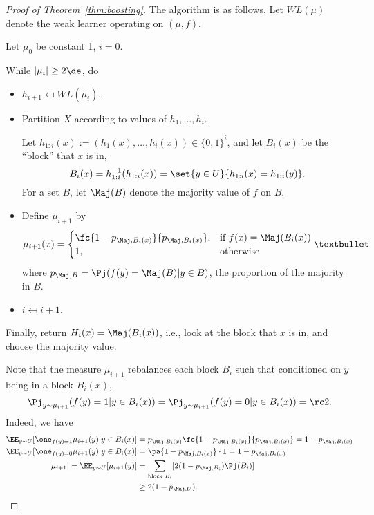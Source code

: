 \begin{proof}[Proof of Theorem~\ref{thm:boosting}]

The algorithm is as follows. Let $WL(\mu)$ denote the weak learner operating on $(\mu, f)$.

Let $\mu_0$ be constant 1, $i=0$.

While $|\mu_i|\ge 2\de$, do
\begin{itemize}
\item
$h_{i+1}\mapsfrom WL(\mu_i)$.
\item
Partition $X$ according to values of $h_1,\ldots,h_i$.

Let $h_{1:i}(x):= (h_1(x),\ldots, h_i(x))\in \{0,1\}^i$, and let $B_i(x)$ be the ``block'' that $x$ is in, 
$$B_i(x) = h_{1:i}^{-1}(h_{1:i}(x)) = \set{y\in U}{h_{1:i}(x)=h_{1:i}(y)}.$$ 
For a set $B$, let $\Maj(B)$ denote the majority value of $f$ on $B$. 
\item
Define $\mu_{i+1}$ by 
%
$$\mu_{i+1}(x) = \begin{cases}
\fc{1-p_{\Maj, B_i(x)}}{p_{\Maj, B_i(x)}},&\text{if } f(x)=\Maj(B_i(x))\\
1,&\text{otherwise}
\end{cases}• $$
where $p_{\Maj,B} = \Pj(f(y) = \Maj(B)| y\in B)$, the proportion of the majority in $B$.
\item
$i\mapsfrom i+1$.
\end{itemize}
Finally, return $H_{i}(x) = \Maj({B_{i}(x)})$, i.e., look at the block that $x$ is in, and choose the majority value.

Note that the measure $\mu_{i+1}$ rebalances %
each block $B_i$ such that conditioned on $y$ being in a block $B_i(x)$, 
$$\Pj_{y\sim \mu_{i+1}}(f(y)=1|y\in B_i(x)) = \Pj_{y \sim \mu_{i+1}}(f(y)=0|y\in B_i(x))=\rc 2.$$
Indeed, we have
\begin{align}
\EE_{y\sim U}[\one_{f(y)=1} 
 \mu_{i+1}(y) |y\in B_i(x)]
 &=p_{\Maj, B_i(x)} \fc{1-p_{\Maj, B_i(x)}}{p_{\Maj, B_i(x)}} = 1-p_{\Maj, B_i(x)}\\
 \EE_{y\sim U}[\one_{f(y)=0} 
 \mu_{i+1}(y) |y\in B_i(x)]
 &=\pa{1-p_{\Maj, B_i(x)}}\cdot 1 = 1-p_{\Maj, B_i(x)}\\
|\mu_{i+1}| =  \EE_{y\sim U}[
 \mu_{i+1}(y)]&=\sum_{\text{block }B_i} [2(1-p_{\Maj, B_i}) \Pj(B_i)]\\
 & \ge 2(1-p_{\Maj,U}).
\end{align}


\end{proof}

